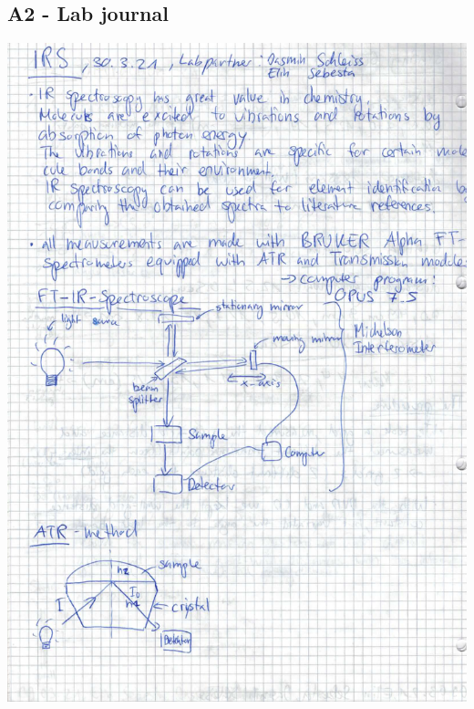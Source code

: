 \documentclass[a4paper,abstracton]{article}	                       %
\begin{document}
\subsection*{A2 - Lab journal}
\includegraphics[page=1,width=\textwidth]{LJ.pdf}
\end{document}

